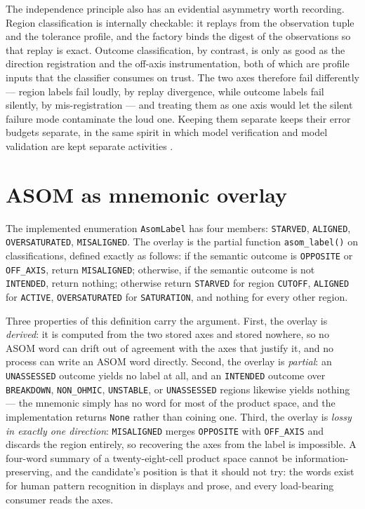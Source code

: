 The independence principle also has an evidential asymmetry worth recording.
Region classification is internally checkable: it replays from the
observation tuple and the tolerance profile, and the factory binds the digest
of the observations so that replay is exact. Outcome classification, by
contrast, is only as good as the direction registration and the off-axis
instrumentation, both of which are profile inputs that the classifier
consumes on trust. The two axes therefore fail differently --- region labels
fail loudly, by replay divergence, while outcome labels fail silently, by
mis-registration --- and treating them as one axis would let the silent
failure mode contaminate the loud one. Keeping them separate keeps their
error budgets separate, in the same spirit in which model verification and
model validation are kept separate activities \cite{sargent}.

\section{ASOM as mnemonic overlay}\label{ch07:sec:asom}

\begin{definition}\label{ch07:def:asom}
The implemented enumeration \texttt{AsomLabel} has four members:
\texttt{STARVED}, \texttt{ALIGNED}, \texttt{OVERSATURATED},
\texttt{MISALIGNED}. The overlay is the partial function
\texttt{asom\_label()} on classifications, defined exactly as follows:
if the semantic outcome is \texttt{OPPOSITE} or \texttt{OFF\_AXIS}, return
\texttt{MISALIGNED}; otherwise, if the semantic outcome is not
\texttt{INTENDED}, return nothing; otherwise return \texttt{STARVED} for
region \texttt{CUTOFF}, \texttt{ALIGNED} for \texttt{ACTIVE},
\texttt{OVERSATURATED} for \texttt{SATURATION}, and nothing for every other
region.
\end{definition}

Three properties of this definition carry the argument. First, the overlay
is \emph{derived}: it is computed from the two stored axes and stored
nowhere, so no ASOM word can drift out of agreement with the axes that
justify it, and no process can write an ASOM word directly. Second, the
overlay is \emph{partial}: an \texttt{UNASSESSED} outcome yields no label at
all, and an \texttt{INTENDED} outcome over \texttt{BREAKDOWN},
\texttt{NON\_OHMIC}, \texttt{UNSTABLE}, or \texttt{UNASSESSED} regions
likewise yields nothing --- the mnemonic simply has no word for most of the
product space, and the implementation returns \texttt{None} rather than
coining one. Third, the overlay is \emph{lossy in exactly one direction}:
\texttt{MISALIGNED} merges \texttt{OPPOSITE} with \texttt{OFF\_AXIS} and
discards the region entirely, so recovering the axes from the label is
impossible. A four-word summary of a twenty-eight-cell product space cannot
be information-preserving, and the candidate's position is that it should
not try: the words exist for human pattern recognition in displays and
prose, and every load-bearing consumer reads the axes.

